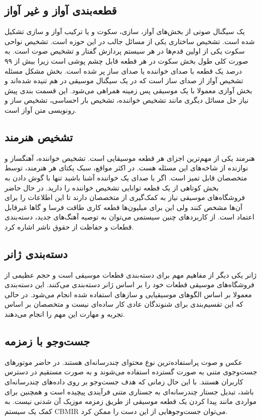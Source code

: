 \subsection{قطعه‌بندی آواز و غیر آواز}
یک سیگنال صوتی از بخش‌های آواز، سازی، سکوت و یا ترکیب آواز و سازی تشکیل شده است.
تشخیص ساختاری یکی از مسائل جالب در این حوزه است. تشخیص نواحی سکوت یکی از اولین
قدم‌ها در هر سیستم پردازش گفتار و تشخیص صوت است. به صورت کلی طول بخش سکوت در هر
قطعه قابل چشم پوشی است زیرا بیش از ۹۹ درصد یک قطعه با صدای خواننده یا صدای ساز
پر شده است. بخش مشکل مسئله تشخیص آواز از صدای ساز است که در یک سیگنال موسیقی در
هم تنیده شده‌اند و بخش آوازی معمولا با یک موسیقی پس زمینه همراهی می‌شود. این
قسمت بندی پیش نیاز حل مسائل دیگری مانند تشخیص خواننده، تشخیص بار احساسی، تشخیص
ساز و رونویسی متن آواز است.

\subsection{تشخیص هنرمند}
هنرمند یکی از مهم‌ترین اجزای هر قطعه موسیقایی است. تشخیص خواننده، آهنگساز و
نوازنده از شاخه‌های این مسئله هست. در اکثر مواقع، سبک یکتای هر هنرمند، توسط
متخصصان قابل تمیز است. اگر با صدای یک خواننده آشنا باشید تنها با گوش دادن به بخش
کوتاهی از یک قطعه توانایی تشخیص خواننده را دارید. در حال حاضر فروشگاه‌های موسیقی
نیاز به کمک‌گیری از متخصصان دارند تا این اطلاعات را برای آن‌ها مشخص کنند ولی این
برای میلیون‌ها قطعه کاری طاقت فرسا و گاها غیرقابل اعتماد است. از کاربردهای چنین
سیستمی می‌توان به توصیه آهنگ‌های جدید، دسته‌بندی قطعات و حفاظت از حقوق ناشر
اشاره کرد.

\subsection{دسته‌بندی ژانر}
ژانر یکی دیگر از مفاهیم مهم برای دسته‌بندی قطعات موسیقی است و حجم عظیمی از
فروشگاه‌های موسیقی قطعات خود را بر اساس ژانر دسته‌بندی می‌کنند. این دسته‌بندی
معمولا بر اساس الگوهای موسیقیایی و سازهای استفاده شده انجام می‌شود. در حالی که
این تقسیم‌بندی برای شنوندگان عادی کار ساده‌ای نیست و متخصصان بر اساس تجربه و
مهارت این مهم را انجام می‌دهند.

\subsection{جست‌وجو با زمزمه}
عکس و صوت پراستفاده‌ترین نوع محتوای چندرسانه‌ای هستند. در حاضر موتورهای جست‌وجوی
متنی به صورت گسترده استفاده می‌شوند و به صورت مستقیم در دسترس کاربران هستند. با
این حال زمانی که هدف جست‌وجو بر روی داده‌های چندرسانه‌ای باشد، تبدیل جستار
چندرسانه‌ای به جستاری متنی فرآیندی پیچیده است و همچنین برای مواردی مانند پیدا
کردن یک قطعه موسیقی از طریق زمزمه موزیک آن شدنی نیست. به کمک یک سیستم
\gls{CBMIR} می‌توان جست‌وجوهایی از این دست را ممکن کرد.

